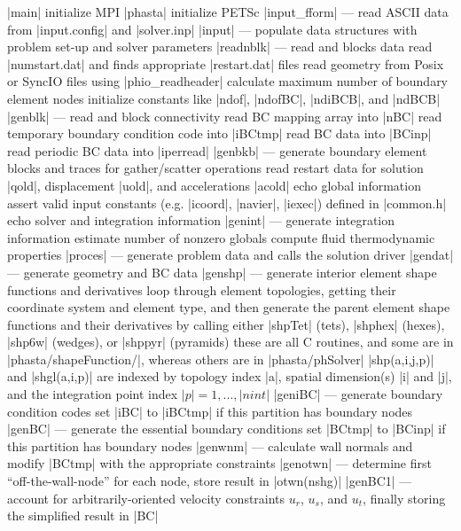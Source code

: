 \documentclass[11pt]{article}
\begin{document}
\begin{outline}[deep]
\1 |main|
	\2 initialize MPI
	\2 |phasta|
		\3 initialize PETSc
		\3 |input_fform| --- read ASCII data from |input.config| and |solver.inp|
		\3 |input| --- populate data structures with problem set-up and solver parameters
			\4 |readnblk| --- read and blocks data
				\5 read |numstart.dat| and finds appropriate |restart.dat| files
				\5 read geometry from Posix or SyncIO files using |phio_readheader|
				\5 calculate maximum number of boundary element nodes
				\5 initialize constants like |ndof|, |ndofBC|, |ndiBCB|, and |ndBCB|
				\5 |genblk| --- read and block connectivity
				\5 read BC mapping array into |nBC|
				\5 read temporary boundary condition code into |iBCtmp|
				\5 read BC data into |BCinp|
				\5 read periodic BC data into |iperread|
				\5 |genbkb| --- generate boundary element blocks and traces for gather/scatter operations
				\5 read restart data for solution |qold|, displacement |uold|, and accelerations |acold|
			\4 echo global information
			\4 assert valid input constants (e.g. |icoord|, |navier|, |iexec|) defined in |common.h|
			\4 echo solver and integration information
			\4 |genint| --- generate integration information
			\4 estimate number of nonzero globals
			\4 compute fluid thermodynamic properties
		\3 |proces| --- generate problem data and calls the solution driver
			\4 |gendat| --- generate geometry and BC data
				\5 |genshp| --- generate interior element shape functions and derivatives
					\6 loop through element topologies, getting their coordinate system and element type, and then generate the parent element shape functions and their derivatives by calling either |shpTet| (tets), |shphex| (hexes), |shp6w| (wedges), or |shppyr| (pyramids)
					\6 these are all C routines, and some are in |phasta/shapeFunction/|, whereas others are in |phasta/phSolver|
					\6 |shp(a,i,j,p)| and |shgl(a,i,p)| are indexed by topology index |a|, spatial dimension(s) |i| and |j|, and the integration point index $|p| = 1, ..., |nint|$
				\5 |geniBC| --- generate boundary condition codes
					\6 set |iBC| to |iBCtmp| if this partition has boundary nodes
				\5 |genBC| --- generate the essential boundary conditions
					\6 set |BCtmp| to |BCinp| if this partition has boundary nodes
					\6 |genwnm| --- calculate wall normals and modify |BCtmp| with the appropriate constraints
					\6 |genotwn| --- determine first ``off-the-wall-node'' for each node, store result in |otwn(nshg)|
					\6 |genBC1| --- account for arbitrarily-oriented velocity constraints $u_r$, $u_s$, and $u_t$, finally storing the simplified result in |BC|

\end{outline}
\end{document}
